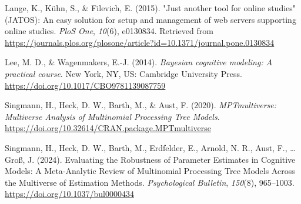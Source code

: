 \documentclass[
  doc,floatsintext]{apa6}
\newlength{\cslhangindent}
\newlength{\cslentryspacingunit} %
\newenvironment{CSLReferences}[2] %
 {%
  \setlength{\parindent}{0pt}
  \ifodd #1
  \let\oldpar\par
  \def\par{\hangindent=\cslhangindent\oldpar}
  \fi
  \setlength{\parskip}{#2\cslentryspacingunit}
 }%
 {}
\begin{document}
\begin{CSLReferences}{1}{0}
\leavevmode{}%
Lange, K., Kühn, S., \& Filevich, E. (2015). "{Just} another tool for online studies" ({JATOS}): {An} easy solution for setup and management of web servers supporting online studies. \emph{PloS One}, \emph{10}(6), e0130834. Retrieved from \url{https://journals.plos.org/plosone/article?id=10.1371/journal.pone.0130834}

\leavevmode{}%
Lee, M. D., \& Wagenmakers, E.-J. (2014). \emph{Bayesian cognitive modeling: {A} practical course}. New York, NY, US: Cambridge University Press. \url{https://doi.org/10.1017/CBO9781139087759}

\leavevmode{}%
Singmann, H., Heck, D. W., Barth, M., \& Aust, F. (2020). \emph{{MPTmultiverse}: {Multiverse Analysis} of {Multinomial Processing Tree Models}}. \url{https://doi.org/10.32614/CRAN.package.MPTmultiverse}

\leavevmode{}%
Singmann, H., Heck, D. W., Barth, M., Erdfelder, E., Arnold, N. R., Aust, F., \ldots{} Groß, J. (2024). Evaluating the {Robustness} of {Parameter Estimates} in {Cognitive Models}: {A Meta-Analytic Review} of {Multinomial Processing Tree Models Across} the {Multiverse} of {Estimation Methods}. \emph{Psychological Bulletin}, \emph{150}(8), 965--1003. \url{https://doi.org/10.1037/bul0000434}

\end{CSLReferences}
\end{document}

